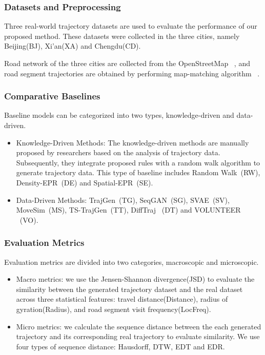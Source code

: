 \subsubsection{Datasets and Preprocessing}
Three real-world trajectory datasets are used to evaluate the performance of our proposed method. These datasets were collected in the three cities, namely Beijing(BJ), Xi'an(XA) and Chengdu(CD).

Road network of the three cities are collected from the OpenStreetMap ~\cite{OpenStreetMap}, and road segment trajectories are obtained by performing map-matching algorithm ~\cite{fmm}.

\subsubsection{Comparative Baselines} 
Baseline models can be categorized into two types, knowledge-driven and data-driven.
\begin{itemize}
    \item Knowledge-Driven Methods:
    The knowledge-driven methods are manually proposed by researchers based on the analysis of trajectory data. Subsequently, they integrate proposed rules with a random walk algorithm to generate trajectory data. This type of baseline includes Random Walk~\cite{node2vec}(RW), Density-EPR~\cite{epr_1}(DE) and Spatial-EPR~\cite{epr_2}(SE).

    \item Data-Driven Methods: TrajGen~\cite{trajgen}(TG), SeqGAN~\cite{SeqGAN}(SG), SVAE~\cite{SVAE}(SV), MoveSim~\cite{MoveSim}(MS), TS-TrajGen~\cite{ts_trajgen}(TT), DiffTraj ~\cite{difftraj}(DT) and VOLUNTEER ~\cite{volunteer}(VO).
\end{itemize}

\subsubsection{Evaluation Metrics}
Evaluation metrics are divided into two categories, macroscopic and microscopic.
\begin{itemize}
    \item Macro metrics: we use the Jensen-Shannon divergence(JSD) to evaluate the similarity between the generated trajectory dataset and the real dataset across three statistical features: travel distance(Distance), radius of gyration(Radius), and road segment visit frequency(LocFreq). 
    \item Micro metrics: we calculate the sequence distance between the each generated trajectory and its corresponding real trajectory to evaluate similarity. We use four types of sequence distance: Hausdorff, DTW, EDT and EDR.
\end{itemize}

